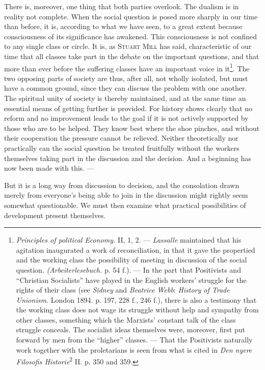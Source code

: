 \documentclass[12pt,a4paper,openany]{book}
\newcommand{\opage}[1]{\marginnote{\footnotesize\textit{[#1]}}}
\begin{document}
There is, moreover, one thing that both parties overlook. The dualism is in reality not complete. When the social
question is posed more sharply in our time than before, it is, according to what we have seen, to a great extent because
consciousness of its significance has awakened. This consciousness is not confined to any single class or circle. It is,
as \textsc{Stuart Mill} has said, characteristic of our time that all classes take part in the debate on the important
questions, and that more than ever before the suffering classes have an important voice in it\footnote[1]{\textit{Principles
of political Economy.} II, 1, 2. --- \emph{Lassalle} maintained that his agitation inaugurated a work of reconciliation,
in that it gave the propertied and the working class the possibility of meeting in discussion of the social question.
\textit{(Arbeiterlesebuch.} p. 54 f.). --- In the part that Positivists and ``Christian Socialists'' have played in the
English workers' struggle for the rights of their class (see \emph{Sidney} and \emph{Beatrice Webb}: \textit{History of
Trade Unionism.} London 1894. p. 197, 228 f., 246 f.), there is also a testimony that the working class does not wage its
struggle without help and sympathy from other classes, something which the Marxists' constant talk of the class struggle
conceals. The socialist ideas themselves were, moreover, first put forward by men from the ``higher'' classes. --- That
the Positivists naturally work together with the proletarians is seen from what is cited in \textit{Den nyere Filosofis
Historie}\textsuperscript{2} II. p. 350 and 359.}. The two opposing parts of society are thus, after all, not wholly
isolated, but must have a common ground, since they can discuss the problem with one another. The spiritual unity of
society is thereby maintained, and at the same time an essential means of getting further is provided. For history shows
clearly that no reform and no improvement leads to the goal if it is not actively
\opage{373}supported by those who are to be helped. They know best where the shoe pinches, and without their
cooperation the pressure cannot be relieved. Neither theoretically nor practically can the social question be treated
fruitfully without the workers themselves taking part in the discussion and the decision. And a beginning has now been
made with this. ---

But it is a long way from discussion to decision, and the consolation drawn merely from everyone's being able to join in
the discussion might rightly seem somewhat questionable. We must then examine what practical possibilities of development
present themselves.
\end{document}
